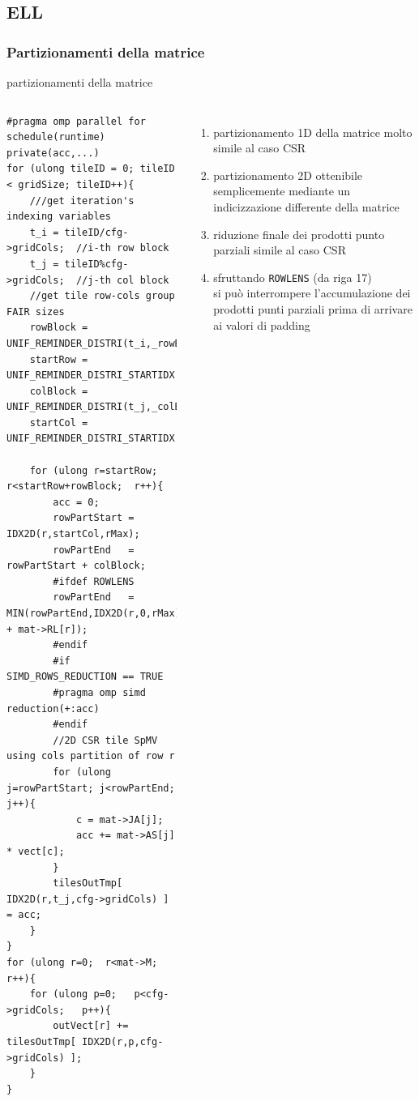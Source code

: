 \documentclass[aspectratio=1610]{beamer}
\newcommand{\vvv}[1]{{\small\texttt{#1}}}
\begin{document}
\subsection{ELL}
\subsubsection{Partizionamenti della matrice}
\begin{frame}[fragile]	{partizionamenti della matrice} 
	\begin{columns}
\begin{lstlisting}
#pragma omp parallel for schedule(runtime) private(acc,...)
for (ulong tileID = 0; tileID < gridSize; tileID++){
    ///get iteration's indexing variables
    t_i = tileID/cfg->gridCols;  //i-th row block
    t_j = tileID%cfg->gridCols;  //j-th col block
    //get tile row-cols group FAIR sizes
    rowBlock = UNIF_REMINDER_DISTRI(t_i,_rowBlock,_rowBlockRem);
    startRow = UNIF_REMINDER_DISTRI_STARTIDX(t_i,_rowBlock,_rowBlockRem);
    colBlock = UNIF_REMINDER_DISTRI(t_j,_colBlock,_colBlockRem);
    startCol = UNIF_REMINDER_DISTRI_STARTIDX(t_j,_colBlock,_colBlockRem);

    for (ulong r=startRow; r<startRow+rowBlock;  r++){
        acc = 0;
        rowPartStart = IDX2D(r,startCol,rMax);
        rowPartEnd   = rowPartStart + colBlock; 
        #ifdef ROWLENS
        rowPartEnd   = MIN(rowPartEnd,IDX2D(r,0,rMax) + mat->RL[r]);
        #endif
        #if SIMD_ROWS_REDUCTION == TRUE
        #pragma omp simd reduction(+:acc)
        #endif
        //2D CSR tile SpMV using cols partition of row r
        for (ulong j=rowPartStart; j<rowPartEnd; j++){
            c = mat->JA[j];
            acc += mat->AS[j] * vect[c];
        }
        tilesOutTmp[ IDX2D(r,t_j,cfg->gridCols) ] = acc;
    }
}
for (ulong r=0;  r<mat->M;   r++){
    for (ulong p=0;   p<cfg->gridCols;   p++){
        outVect[r] += tilesOutTmp[ IDX2D(r,p,cfg->gridCols) ];
    }
}
\end{lstlisting}
			\begin{enumerate}
				\item  
					partizionamento 1D della matrice molto simile al caso CSR
				\pause
				\item  	partizionamento 2D ottenibile semplicemente mediante un indicizzazione
						differente della matrice
				\item  	riduzione finale dei prodotti punto parziali simile al caso CSR
				\pause
				\item 	sfruttando \vvv{ROWLENS} (da riga 17)\\
						si può interrompere l'accumulazione dei prodotti punti parziali 
						prima di arrivare ai valori di padding 
			\end{enumerate}
		\end{columns}
\end{frame}
\end{document}
